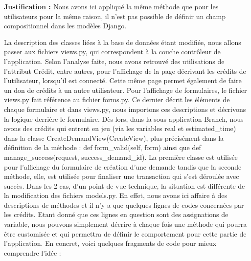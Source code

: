 \textbf{\underline{Justification : }} Nous avons ici appliqué la même méthode que pour les utilisateurs pour la même raison,  il n'est pas possible de définir un champ compositionnel dans les modèles Django.  

La description des classes liées à la base de données étant modifiée,  nous allons passer aux fichiers views.py,  qui correspondent à la couche contrôleur de l'application.  Selon l'analyse faite,  nous avons retrouvé des utilisations de l'attribut Crédit,  entre autres,  pour l'affichage de la page décrivant les crédits de l'utilisateur,  lorsqu'il est connecté.  Cette même page permet également de faire un don de crédits à un autre utilisateur.  Pour l'affichage de formulaires,  le fichier views.py fait référence au fichier forms.py.  Ce dernier décrit les éléments de chaque formulaire et dans views.py,  nous importons ces descriptions et décrivons la logique derrière le formulaire.  Dès lors,  dans la sous-application Branch,  nous avons des crédits qui entrent en jeu (via les variables real et estimated\_time) dans la classe CreateDemandView(CreateView),  plus précisément dans la définition de la méthode : def form\_valid(self, form) ainsi que def manage\_success(request, success\_demand\_id).  La première classe est utilisée pour l'affichage du formulaire de création d'une demande tandis que la seconde méthode,  elle,  est utilisée pour finaliser une transaction qui s'est déroulée avec succès.  Dans les 2 cas,  d'un point de vue technique,  la situation est différente de la modification des fichiers models.py.  En effet,  nous avons ici affaire à des descriptions de méthodes et il n'y a que quelques lignes de codes concernées par les crédits.  Etant donné que ces lignes en question sont des assignations de variable,  nous pouvons simplement décrire à chaque fois une méthode qui pourra être customisée et qui permettra de définir le comportement pour cette partie de l'application.  En concret,  voici quelques fragments de code pour mieux comprendre l'idée : 

